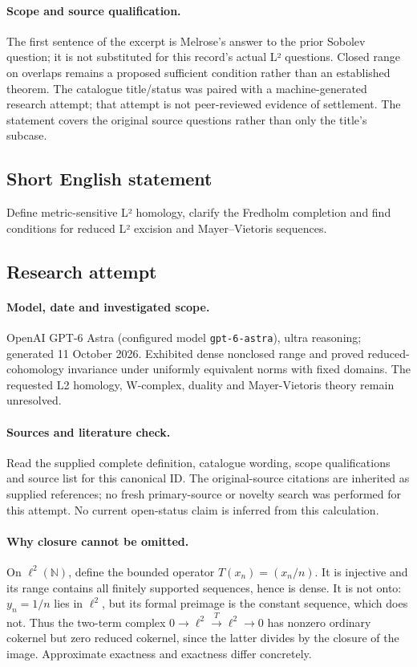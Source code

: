 \documentclass[11pt]{article}
\begin{document}
\paragraph{Scope and source qualification.}The first sentence of the excerpt is Melrose’s answer to the prior Sobolev question; it is not substituted for this record’s actual L² questions. Closed range on overlaps remains a proposed sufficient condition rather than an established theorem. The catalogue title/status was paired with a machine-generated research attempt; that attempt is not peer-reviewed evidence of settlement. The statement covers the original source questions rather than only the title’s subcase.
\subsection{Short English statement}
Define metric-sensitive L² homology, clarify the Fredholm completion and find conditions for reduced L² excision and Mayer–Vietoris sequences.
\subsection{Research attempt}
\paragraph{Model, date and investigated scope.}
OpenAI GPT-6 Astra (configured model \texttt{gpt-6-astra}), ultra reasoning; generated 11 October 2026. Exhibited dense nonclosed range and proved reduced-cohomology invariance under uniformly equivalent norms with fixed domains. The requested L2 homology, W-complex, duality and Mayer-Vietoris theory remain unresolved.

\paragraph{Sources and literature check.}
Read the supplied complete definition, catalogue wording, scope qualifications and source list for this canonical ID. The original-source citations are inherited as supplied references; no fresh primary-source or novelty search was performed for this attempt. No current open-status claim is inferred from this calculation.

\paragraph{Why closure cannot be omitted.}On \(\ell^2(\mathbb N)\), define the bounded operator \(T(x_n)=(x_n/n)\). It is injective and its range contains all finitely supported sequences, hence is dense. It is not onto: \(y_n=1/n\) lies in \(\ell^2\), but its formal preimage is the constant sequence, which does not. Thus the two-term complex \(0\to\ell^2\xrightarrow{T}\ell^2\to0\) has nonzero ordinary cokernel but zero reduced cokernel, since the latter divides by the closure of the image. Approximate exactness and exactness differ concretely.
\end{document}
